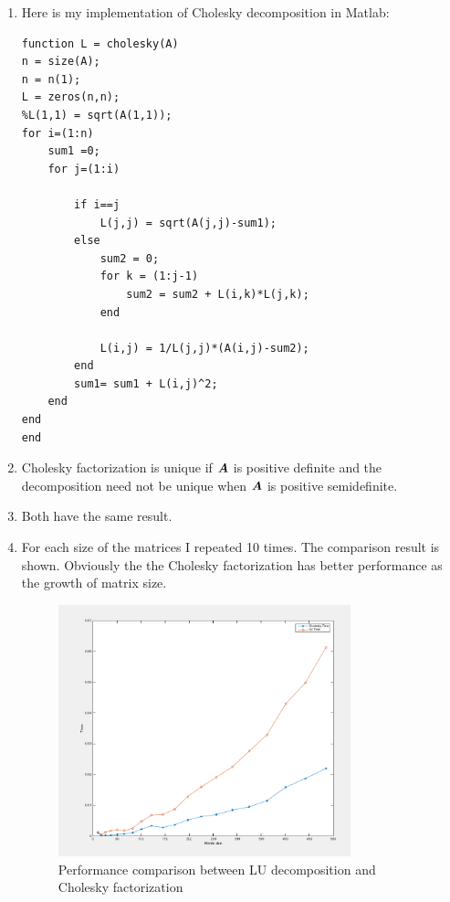 \documentclass{article}
\begin{document}
\begin{enumerate} 
\item 
Here is my implementation of Cholesky decomposition in Matlab: 
\begin{lstlisting}
function L = cholesky(A)
n = size(A); 
n = n(1); 
L = zeros(n,n);
%L(1,1) = sqrt(A(1,1)); 
for i=(1:n)
    sum1 =0;     
    for j=(1:i) 

        if i==j
            L(j,j) = sqrt(A(j,j)-sum1); 
        else 
            sum2 = 0; 
            for k = (1:j-1) 
                sum2 = sum2 + L(i,k)*L(j,k); 
            end 
            
            L(i,j) = 1/L(j,j)*(A(i,j)-sum2); 
        end 
        sum1= sum1 + L(i,j)^2;   
    end 
end 
end 
\end{lstlisting} 
\item 
Cholesky factorization is unique if $\boldsymbol{A}$ is positive definite and the decomposition need not be unique when $\boldsymbol{A}$ is positive semidefinite.  

\item 
Both have the same result. 
\item 
For each size of the matrices I repeated 10 times. The comparison result is shown.   Obviously the the Cholesky factorization has better performance as the growth of matrix size. 
\begin{figure} 
\centering 
\includegraphics[width=0.8\textwidth]{luVScholesky}
\caption{Performance comparison between LU decomposition and Cholesky factorization}
\end{figure}


\end{enumerate}
\end{document}
